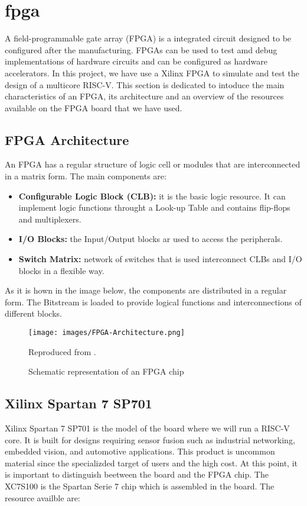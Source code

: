 \section{\gls{fpga}}

A field-programmable gate array (FPGA) is a integrated circuit designed to be configured after the  manufacturing. FPGAs can be used to test amd debug implementations of hardware circuits and can be configured as  hardware accelerators. In this project, we have use a Xilinx FPGA to simulate and test the design of a multicore RISC-V. This section is dedicated to intoduce the main characteristics of an FPGA, its architecture and an overview of the resources available on the FPGA board that we have used. 

\subsection{FPGA Architecture}
An FPGA has a regular structure of logic cell or modules that are interconnected in a matrix form. The main components are:

\begin{itemize}
	\item \textbf{Configurable Logic Block (CLB):} it is the basic logic resource. It can implement logic functions throught a Look-up Table and contains flip-flops and multiplexers. 
	\item \textbf{I/O Blocks:} the Input/Output blocks ar used to access the peripherals. 
	\item \textbf{Switch Matrix:} network of switches that is used interconnect CLBs and I/O blocks in a flexible way.
\end{itemize}

As it is hown in the image below, the components are distributed in a regular  form. The Bitstream is loaded to provide logical functions and interconnections of different blocks. 

\begin{figure}[h]
    \centering
    \texttt{[image: images/FPGA-Architecture.png]}
    \caption{Schematic representation of an FPGA chip} Reproduced from \cite{FPGA}.
    \label{fig:moore}
\end{figure}

\subsection{Xilinx Spartan 7 SP701}
Xilinx Spartan 7 SP701 is the model of the board where we will run a RISC-V core. It is built for designs requiring sensor fusion such as industrial networking, embedded vision, and automotive applications. This product is uncommon material since the specializded target of users and the high cost. At this point, it is important to distinguish beetween the board and the FPGA chip. The XC7S100  is the Spartan Serie 7 chip which is assembled in the board. The resource availble are: 

